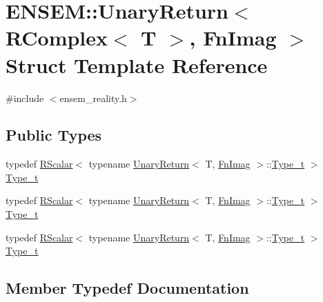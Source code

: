 \hypertarget{structENSEM_1_1UnaryReturn_3_01RComplex_3_01T_01_4_00_01FnImag_01_4}{}\section{E\+N\+S\+EM\+:\+:Unary\+Return$<$ R\+Complex$<$ T $>$, Fn\+Imag $>$ Struct Template Reference}
\label{structENSEM_1_1UnaryReturn_3_01RComplex_3_01T_01_4_00_01FnImag_01_4}


{\ttfamily \#include $<$ensem\+\_\+reality.\+h$>$}

\subsection*{Public Types}
\begin{DoxyCompactItemize}
\item 
typedef \mbox{\hyperlink{classENSEM_1_1RScalar}{R\+Scalar}}$<$ typename \mbox{\hyperlink{structENSEM_1_1UnaryReturn}{Unary\+Return}}$<$ T, \mbox{\hyperlink{structENSEM_1_1FnImag}{Fn\+Imag}} $>$\+::\mbox{\hyperlink{structENSEM_1_1UnaryReturn_3_01RComplex_3_01T_01_4_00_01FnImag_01_4_a5e8cda9513c7e5cb0b7182122bd82513}{Type\+\_\+t}} $>$ \mbox{\hyperlink{structENSEM_1_1UnaryReturn_3_01RComplex_3_01T_01_4_00_01FnImag_01_4_a5e8cda9513c7e5cb0b7182122bd82513}{Type\+\_\+t}}
\item 
typedef \mbox{\hyperlink{classENSEM_1_1RScalar}{R\+Scalar}}$<$ typename \mbox{\hyperlink{structENSEM_1_1UnaryReturn}{Unary\+Return}}$<$ T, \mbox{\hyperlink{structENSEM_1_1FnImag}{Fn\+Imag}} $>$\+::\mbox{\hyperlink{structENSEM_1_1UnaryReturn_3_01RComplex_3_01T_01_4_00_01FnImag_01_4_a5e8cda9513c7e5cb0b7182122bd82513}{Type\+\_\+t}} $>$ \mbox{\hyperlink{structENSEM_1_1UnaryReturn_3_01RComplex_3_01T_01_4_00_01FnImag_01_4_a5e8cda9513c7e5cb0b7182122bd82513}{Type\+\_\+t}}
\item 
typedef \mbox{\hyperlink{classENSEM_1_1RScalar}{R\+Scalar}}$<$ typename \mbox{\hyperlink{structENSEM_1_1UnaryReturn}{Unary\+Return}}$<$ T, \mbox{\hyperlink{structENSEM_1_1FnImag}{Fn\+Imag}} $>$\+::\mbox{\hyperlink{structENSEM_1_1UnaryReturn_3_01RComplex_3_01T_01_4_00_01FnImag_01_4_a5e8cda9513c7e5cb0b7182122bd82513}{Type\+\_\+t}} $>$ \mbox{\hyperlink{structENSEM_1_1UnaryReturn_3_01RComplex_3_01T_01_4_00_01FnImag_01_4_a5e8cda9513c7e5cb0b7182122bd82513}{Type\+\_\+t}}
\end{DoxyCompactItemize}


\subsection{Member Typedef Documentation}
\mbox{\label{structENSEM_1_1UnaryReturn_3_01RComplex_3_01T_01_4_00_01FnImag_01_4_a5e8cda9513c7e5cb0b7182122bd82513}} 
